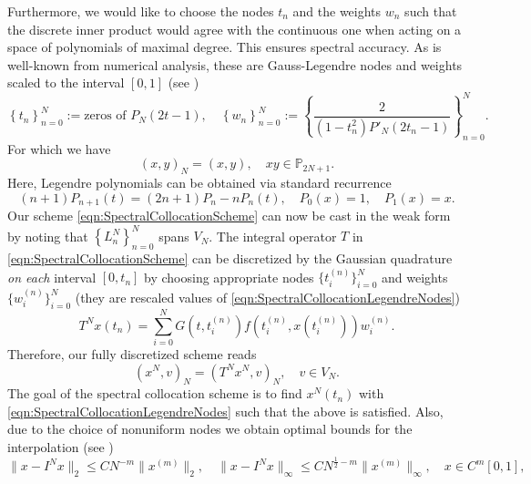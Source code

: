 \documentclass[12pt,a4paper]{article}
\begin{document}
Furthermore, we would like to choose the nodes $t_n$ and the weights $w_n$ such that the discrete inner product would agree with the continuous one when acting on a space of polynomials of maximal degree. This ensures spectral accuracy. As is well-known from numerical analysis, these are Gauss-Legendre nodes and weights scaled to the interval $[0,1]$ (see \cite{canuto2006spectral})
\begin{equation}\label{eqn:SpectralCollocationLegendreNodes}
	\left\{t_n\right\}_{n=0}^N := \text{zeros of }P_N(2t-1), \quad \left\{w_n\right\}_{n=0}^N := \left\{\frac{2}{(1-t_n^2) P'_N(2t_n-1)}\right\}_{n=0}^N.
\end{equation}
For which we have
\begin{equation}\label{eqn:DiscreteContinuousInner}
	(x,y)_N = (x,y), \quad xy \in \mathbb{P}_{2N+1}.
\end{equation}
Here, Legendre polynomials can be obtained via standard recurrence
\begin{equation}
	(n+1)P_{n+1}(t) = (2n+1)P_n - n P_n(t), \quad P_0(x) = 1, \quad P_1(x) = x.
\end{equation}
Our scheme \eqref{eqn:SpectralCollocationScheme} can now be cast in the weak form by noting that $\left\{L^N_n\right\}_{n=0}^N$ spans $V_N$. The integral operator $T$ in \eqref{eqn:SpectralCollocationScheme} can be discretized by the Gaussian quadrature \emph{on each} interval $[0,t_n]$ by choosing appropriate nodes $\{t_i^{(n)}\}_{i=0}^N$ and weights $\{w_i^{(n)}\}_{i=0}^N$ (they are rescaled values of \eqref{eqn:SpectralCollocationLegendreNodes})
\begin{equation}\label{eqn:OperatorTN}
	T^N x(t_n) = \sum_{i=0}^N G(t, t_i^{(n)}) f(t_i^{(n)}, x(t_i^{(n)})) w_i^{(n)}.
\end{equation}
Therefore, our fully discretized scheme reads
\begin{equation}\label{eqn:SpectralCollocationSchemeWeak}
	(x^N, v)_N = (T^Nx^N, v)_N, \quad v \in V_N.
\end{equation}
The goal of the spectral collocation scheme is to find $x^N(t_n)$ with \eqref{eqn:SpectralCollocationLegendreNodes} such that the above is satisfied. Also, due to the choice of nonuniform nodes we obtain optimal bounds for the interpolation (see \cite{canuto2006spectral})
\begin{equation}\label{eqn:SpectralInterpolationError}
	\|x - I^N x\|_2 \leq C N^{-m} \|x^{(m)}\|_2, \quad \|x - I^N x\|_\infty \leq C N^{\frac{1}{2}-m} \|x^{(m)}\|_\infty, \quad x \in C^m[0,1],
\end{equation}
\end{document}
